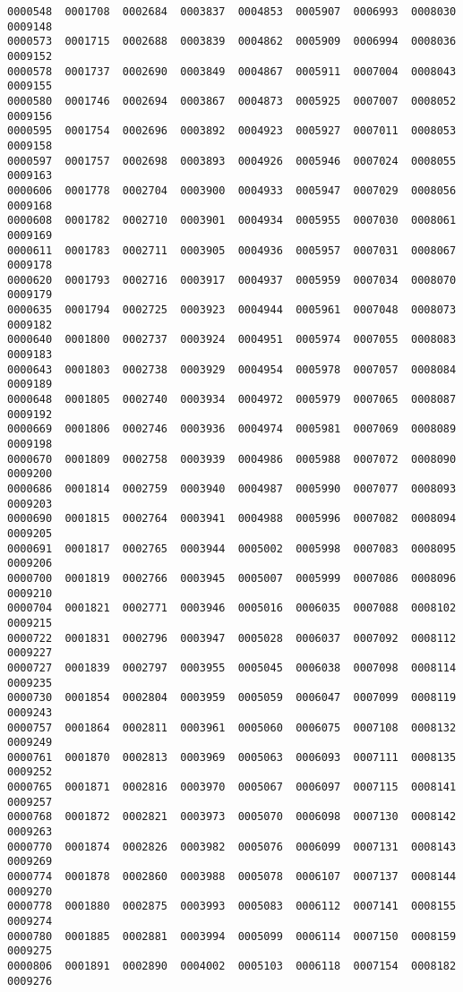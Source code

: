 \documentclass[11pt]{article}
\begin{document}
\begin{Verbatim}[commandchars=\\\{\}]
0000548  0001708  0002684  0003837  0004853  0005907  0006993  0008030	0009148
0000573  0001715  0002688  0003839  0004862  0005909  0006994  0008036	0009152
0000578  0001737  0002690  0003849  0004867  0005911  0007004  0008043	0009155
0000580  0001746  0002694  0003867  0004873  0005925  0007007  0008052	0009156
0000595  0001754  0002696  0003892  0004923  0005927  0007011  0008053	0009158
0000597  0001757  0002698  0003893  0004926  0005946  0007024  0008055	0009163
0000606  0001778  0002704  0003900  0004933  0005947  0007029  0008056	0009168
0000608  0001782  0002710  0003901  0004934  0005955  0007030  0008061	0009169
0000611  0001783  0002711  0003905  0004936  0005957  0007031  0008067	0009178
0000620  0001793  0002716  0003917  0004937  0005959  0007034  0008070	0009179
0000635  0001794  0002725  0003923  0004944  0005961  0007048  0008073	0009182
0000640  0001800  0002737  0003924  0004951  0005974  0007055  0008083	0009183
0000643  0001803  0002738  0003929  0004954  0005978  0007057  0008084	0009189
0000648  0001805  0002740  0003934  0004972  0005979  0007065  0008087	0009192
0000669  0001806  0002746  0003936  0004974  0005981  0007069  0008089	0009198
0000670  0001809  0002758  0003939  0004986  0005988  0007072  0008090	0009200
0000686  0001814  0002759  0003940  0004987  0005990  0007077  0008093	0009203
0000690  0001815  0002764  0003941  0004988  0005996  0007082  0008094	0009205
0000691  0001817  0002765  0003944  0005002  0005998  0007083  0008095	0009206
0000700  0001819  0002766  0003945  0005007  0005999  0007086  0008096	0009210
0000704  0001821  0002771  0003946  0005016  0006035  0007088  0008102	0009215
0000722  0001831  0002796  0003947  0005028  0006037  0007092  0008112	0009227
0000727  0001839  0002797  0003955  0005045  0006038  0007098  0008114	0009235
0000730  0001854  0002804  0003959  0005059  0006047  0007099  0008119	0009243
0000757  0001864  0002811  0003961  0005060  0006075  0007108  0008132	0009249
0000761  0001870  0002813  0003969  0005063  0006093  0007111  0008135	0009252
0000765  0001871  0002816  0003970  0005067  0006097  0007115  0008141	0009257
0000768  0001872  0002821  0003973  0005070  0006098  0007130  0008142	0009263
0000770  0001874  0002826  0003982  0005076  0006099  0007131  0008143	0009269
0000774  0001878  0002860  0003988  0005078  0006107  0007137  0008144	0009270
0000778  0001880  0002875  0003993  0005083  0006112  0007141  0008155	0009274
0000780  0001885  0002881  0003994  0005099  0006114  0007150  0008159	0009275
0000806  0001891  0002890  0004002  0005103  0006118  0007154  0008182	0009276

\end{Verbatim}
\end{document}
